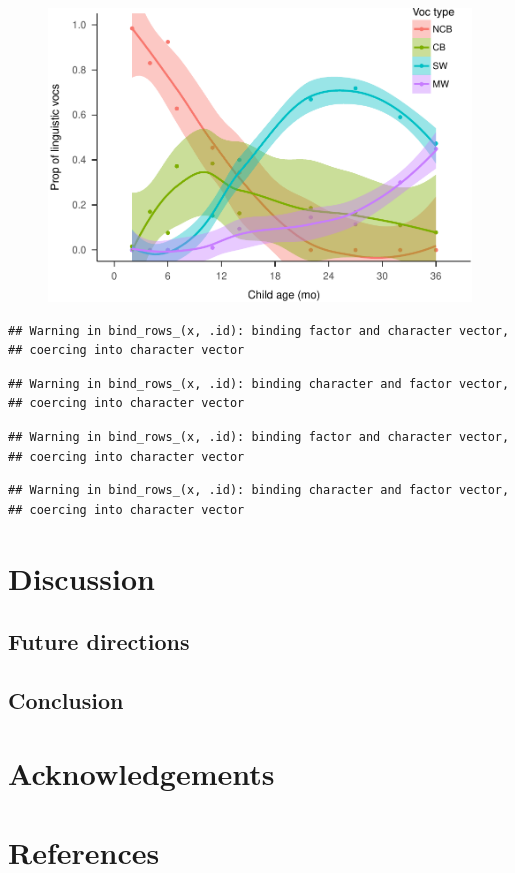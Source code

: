 \documentclass[floatsintext,man]{apa6}
\theoremstyle{definition}
\theoremstyle{definition}
\theoremstyle{definition}
\theoremstyle{remark}
\begin{document}
\begin{figure}
\centering
\includegraphics{Tseltal-CLE_files/figure-latex/plot_chi_voctypes_overall-1.pdf}
\caption{}
\end{figure}

\begin{verbatim}
## Warning in bind_rows_(x, .id): binding factor and character vector,
## coercing into character vector
\end{verbatim}

\begin{verbatim}
## Warning in bind_rows_(x, .id): binding character and factor vector,
## coercing into character vector
\end{verbatim}

\begin{verbatim}
## Warning in bind_rows_(x, .id): binding factor and character vector,
## coercing into character vector
\end{verbatim}

\begin{verbatim}
## Warning in bind_rows_(x, .id): binding character and factor vector,
## coercing into character vector
\end{verbatim}

\section{Discussion}\label{disc}

\subsection{Future directions}\label{disc-future}

\subsection{Conclusion}\label{disc-conclusion}

\section{Acknowledgements}\label{acknowledgements}

\newpage

\section{References}\label{refs}

\begingroup
\setlength{\parindent}{-0.5in} \setlength{\leftskip}{0.5in}

\hypertarget{refs}{}

\endgroup
\end{document}

